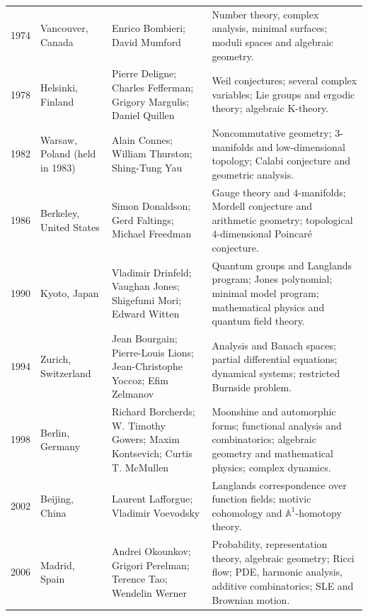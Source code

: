 {\begin{longtable}{@{}L{0.07\textwidth}L{0.16\textwidth}L{0.33\textwidth}L{0.36\textwidth}@{}}
        1974
        & Vancouver, Canada
        & Enrico Bombieri; David Mumford
        & Number theory, complex analysis, minimal surfaces; moduli spaces and
          algebraic geometry. \\

        1978
        & Helsinki, Finland
        & Pierre Deligne; Charles Fefferman; Grigory Margulis; Daniel Quillen
        & Weil conjectures; several complex variables; Lie groups and ergodic
          theory; algebraic K-theory. \\

        1982
        & Warsaw, Poland (held in 1983)
        & Alain Connes; William Thurston; Shing-Tung Yau
        & Noncommutative geometry; $3$-manifolds and low-dimensional topology;
          Calabi conjecture and geometric analysis. \\

        1986
        & Berkeley, United States
        & Simon Donaldson; Gerd Faltings; Michael Freedman
        & Gauge theory and $4$-manifolds; Mordell conjecture and arithmetic
          geometry; topological $4$-dimensional Poincaré conjecture. \\

        1990
        & Kyoto, Japan
        & Vladimir Drinfeld; Vaughan Jones; Shigefumi Mori; Edward Witten
        & Quantum groups and Langlands program; Jones polynomial; minimal
          model program; mathematical physics and quantum field theory. \\

        1994
        & Zurich, Switzerland
        & Jean Bourgain; Pierre-Louis Lions; Jean-Christophe Yoccoz; Efim Zelmanov
        & Analysis and Banach spaces; partial differential equations; dynamical
          systems; restricted Burnside problem. \\

        1998
        & Berlin, Germany
        & Richard Borcherds; W. Timothy Gowers; Maxim Kontsevich; Curtis T. McMullen
        & Moonshine and automorphic forms; functional analysis and combinatorics;
          algebraic geometry and mathematical physics; complex dynamics. \\

        2002
        & Beijing, China
        & Laurent Lafforgue; Vladimir Voevodsky
        & Langlands correspondence over function fields; motivic cohomology and
          $\mathbb{A}^1$-homotopy theory. \\

        2006
        & Madrid, Spain
        & Andrei Okounkov; Grigori Perelman; Terence Tao; Wendelin Werner
        & Probability, representation theory, algebraic geometry; Ricci flow;
          PDE, harmonic analysis, additive combinatorics; SLE and Brownian motion. \\


\end{longtable}}
